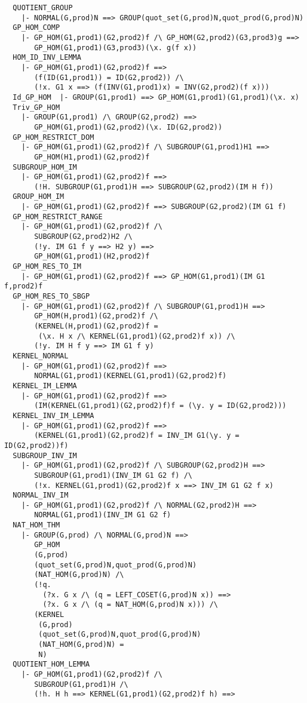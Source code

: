 \begin{verbatim}
  QUOTIENT_GROUP
    |- NORMAL(G,prod)N ==> GROUP(quot_set(G,prod)N,quot_prod(G,prod)N)
  GP_HOM_COMP
    |- GP_HOM(G1,prod1)(G2,prod2)f /\ GP_HOM(G2,prod2)(G3,prod3)g ==>
       GP_HOM(G1,prod1)(G3,prod3)(\x. g(f x))
  HOM_ID_INV_LEMMA
    |- GP_HOM(G1,prod1)(G2,prod2)f ==>
       (f(ID(G1,prod1)) = ID(G2,prod2)) /\
       (!x. G1 x ==> (f(INV(G1,prod1)x) = INV(G2,prod2)(f x)))
  Id_GP_HOM  |- GROUP(G1,prod1) ==> GP_HOM(G1,prod1)(G1,prod1)(\x. x)
  Triv_GP_HOM
    |- GROUP(G1,prod1) /\ GROUP(G2,prod2) ==>
       GP_HOM(G1,prod1)(G2,prod2)(\x. ID(G2,prod2))
  GP_HOM_RESTRICT_DOM
    |- GP_HOM(G1,prod1)(G2,prod2)f /\ SUBGROUP(G1,prod1)H1 ==>
       GP_HOM(H1,prod1)(G2,prod2)f
  SUBGROUP_HOM_IM
    |- GP_HOM(G1,prod1)(G2,prod2)f ==>
       (!H. SUBGROUP(G1,prod1)H ==> SUBGROUP(G2,prod2)(IM H f))
  GROUP_HOM_IM
    |- GP_HOM(G1,prod1)(G2,prod2)f ==> SUBGROUP(G2,prod2)(IM G1 f)
  GP_HOM_RESTRICT_RANGE
    |- GP_HOM(G1,prod1)(G2,prod2)f /\
       SUBGROUP(G2,prod2)H2 /\
       (!y. IM G1 f y ==> H2 y) ==>
       GP_HOM(G1,prod1)(H2,prod2)f
  GP_HOM_RES_TO_IM
    |- GP_HOM(G1,prod1)(G2,prod2)f ==> GP_HOM(G1,prod1)(IM G1 f,prod2)f
  GP_HOM_RES_TO_SBGP
    |- GP_HOM(G1,prod1)(G2,prod2)f /\ SUBGROUP(G1,prod1)H ==>
       GP_HOM(H,prod1)(G2,prod2)f /\
       (KERNEL(H,prod1)(G2,prod2)f =
        (\x. H x /\ KERNEL(G1,prod1)(G2,prod2)f x)) /\
       (!y. IM H f y ==> IM G1 f y)
  KERNEL_NORMAL
    |- GP_HOM(G1,prod1)(G2,prod2)f ==>
       NORMAL(G1,prod1)(KERNEL(G1,prod1)(G2,prod2)f)
  KERNEL_IM_LEMMA
    |- GP_HOM(G1,prod1)(G2,prod2)f ==>
       (IM(KERNEL(G1,prod1)(G2,prod2)f)f = (\y. y = ID(G2,prod2)))
  KERNEL_INV_IM_LEMMA
    |- GP_HOM(G1,prod1)(G2,prod2)f ==>
       (KERNEL(G1,prod1)(G2,prod2)f = INV_IM G1(\y. y = ID(G2,prod2))f)
  SUBGROUP_INV_IM
    |- GP_HOM(G1,prod1)(G2,prod2)f /\ SUBGROUP(G2,prod2)H ==>
       SUBGROUP(G1,prod1)(INV_IM G1 G2 f) /\
       (!x. KERNEL(G1,prod1)(G2,prod2)f x ==> INV_IM G1 G2 f x)
  NORMAL_INV_IM
    |- GP_HOM(G1,prod1)(G2,prod2)f /\ NORMAL(G2,prod2)H ==>
       NORMAL(G1,prod1)(INV_IM G1 G2 f)
  NAT_HOM_THM
    |- GROUP(G,prod) /\ NORMAL(G,prod)N ==>
       GP_HOM
       (G,prod)
       (quot_set(G,prod)N,quot_prod(G,prod)N)
       (NAT_HOM(G,prod)N) /\
       (!q.
         (?x. G x /\ (q = LEFT_COSET(G,prod)N x)) ==>
         (?x. G x /\ (q = NAT_HOM(G,prod)N x))) /\
       (KERNEL
        (G,prod)
        (quot_set(G,prod)N,quot_prod(G,prod)N)
        (NAT_HOM(G,prod)N) =
        N)
  QUOTIENT_HOM_LEMMA
    |- GP_HOM(G1,prod1)(G2,prod2)f /\
       SUBGROUP(G1,prod1)H /\
       (!h. H h ==> KERNEL(G1,prod1)(G2,prod2)f h) ==>

\end{verbatim}
